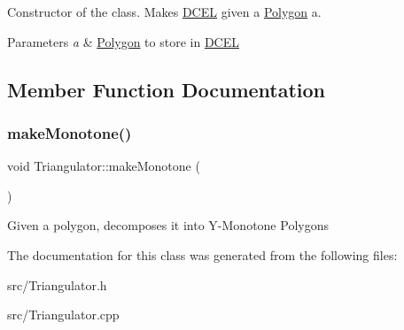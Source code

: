 Constructor of the class. Makes \hyperlink{classDCEL}{D\+C\+EL} given a \hyperlink{classPolygon}{Polygon} a. 
\begin{DoxyParams}{Parameters}
{\em a} & \hyperlink{classPolygon}{Polygon} to store in \hyperlink{classDCEL}{D\+C\+EL} \\
\hline
\end{DoxyParams}


\subsection{Member Function Documentation}
\mbox{\label{classTriangulator_aaf5c2efd036eb83c81d085b1f0b267ab}} 
\subsubsection{\texorpdfstring{make\+Monotone()}{makeMonotone()}}
{\footnotesize\ttfamily void Triangulator\+::make\+Monotone (\begin{DoxyParamCaption}{ }\end{DoxyParamCaption})}

Given a polygon, decomposes it into Y-\/\+Monotone Polygons 

The documentation for this class was generated from the following files\+:\begin{DoxyCompactItemize}
\item 
src/Triangulator.\+h\item 
src/Triangulator.\+cpp\end{DoxyCompactItemize}
